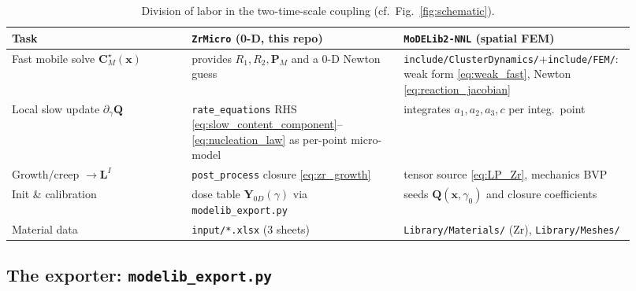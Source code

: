 \documentclass[11pt]{article}
\newcommand{\CM}{\mathbf{C}_{M}}
\newcommand{\PM}{\mathbf{P}_{M}}
\newcommand{\ZrMicro}{\texttt{ZrMicro}}
\newcommand{\MoDELib}{\texttt{MoDELib2-NNL}}
\newcommand{\code}[1]{\texttt{#1}}
\begin{document}
\begin{table}[h!]
\centering
\small
\begin{tabular}{@{}p{0.28\linewidth} p{0.33\linewidth} p{0.31\linewidth}@{}}
\toprule
\textbf{Task} & \textbf{\ZrMicro{} (0-D, this repo)} & \textbf{\MoDELib{} (spatial FEM)} \\
\midrule
Fast mobile solve $\CM^\star(\mathbf x)$ & provides $R_1,R_2,\PM$ and a 0-D Newton guess & \code{include/ClusterDynamics/}+\code{include/FEM/}: weak form \eqref{eq:weak_fast}, Newton \eqref{eq:reaction_jacobian} \\
Local slow update $\partial_\gamma\mathbf Q$ & \code{rate\_equations} RHS \eqref{eq:slow_content_component}--\eqref{eq:nucleation_law} as per-point micro-model & integrates $a_1,a_2,a_3,c$ per integ.\ point \\
Growth/creep $\to\mathbf L^I$ & \code{post\_process} closure \eqref{eq:zr_growth} & tensor source \eqref{eq:LP_Zr}, mechanics BVP \\
Init \& calibration & dose table $\mathbf Y_{0D}(\gamma)$ via \code{modelib\_export.py} & seeds $\mathbf Q(\mathbf x,\gamma_0)$ and closure coefficients \\
Material data & \code{input/*.xlsx} (3 sheets) & \code{Library/Materials/} (Zr), \code{Library/Meshes/} \\
\bottomrule
\end{tabular}
\caption{Division of labor in the two-time-scale coupling (cf.\ Fig.~\ref{fig:schematic}).}
\end{table}

\subsection{The exporter: \texttt{modelib\_export.py}}
\label{sec:exporter}
\end{document}
